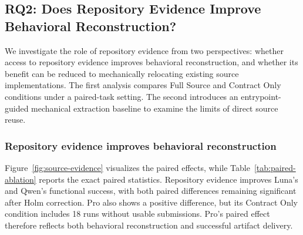 \documentclass[acmsmall,screen,review,anonymous]{acmart}
\begin{document}
\subsection{RQ2: Does Repository Evidence Improve Behavioral Reconstruction?}
\label{sec:rq2}
\label{sec:source-ablation-results}

We investigate the role of repository evidence from two perspectives:
whether access to repository evidence improves behavioral reconstruction, and
whether its benefit can be reduced to mechanically relocating existing source
implementations. The first analysis compares Full Source and Contract Only
conditions under a paired-task setting. The second introduces an
entrypoint-guided mechanical extraction baseline to examine the limits of
direct source reuse.

\subsubsection{Repository evidence improves behavioral reconstruction}

Figure~\ref{fig:source-evidence} visualizes the paired effects, while
Table~\ref{tab:paired-ablation} reports the exact paired statistics.
Repository evidence improves Luna's and Qwen's functional success, with both
paired differences remaining significant after Holm correction. Pro also shows
a positive difference, but its Contract Only condition includes 18 runs without
usable submissions. Pro's paired effect therefore reflects both behavioral
reconstruction and successful artifact delivery.
\end{document}
